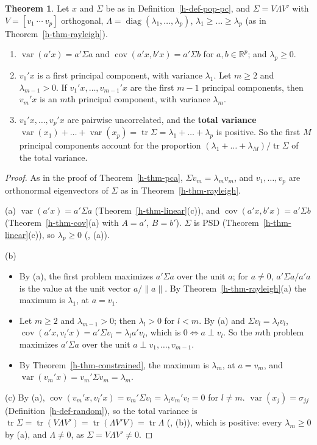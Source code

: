 \documentclass[12pt]{article}
\newcommand{\R}{\mathbb R}
\DeclareMathOperator{\tr}{tr}
\DeclareMathOperator{\diag}{diag}
\DeclareMathOperator\var{var}
\DeclareMathOperator\cov{cov}
\theoremstyle{definition}
\newtheorem{theorem}{Theorem}
\begin{document}
\begin{theorem}\label{h-thm-pop-pca}
Let \(x\) and \(\Sigma\) be as in Definition~\ref{h-def-pop-pc}, and \(\Sigma=V\Lambda V'\) with
\(V=[v_1\ \cdots\ v_p]\) orthogonal, \(\Lambda=\diag(\lambda_1,\dots,\lambda_p)\),
\(\lambda_1\geqslant\dots\geqslant\lambda_p\) (as in Theorem~\ref{h-thm-rayleigh}).
\begin{enumerate}
\item \(\var(a'x)=a'\Sigma a\) and \(\cov(a'x,b'x)=a'\Sigma b\) for \(a,b\in\R^p\); and
\(\lambda_p\geqslant0\).
\item \(v_1'x\) is a first principal component, with variance \(\lambda_1\). Let \(m\geqslant2\) and \(\lambda_{m-1}>0\).
If \(v_1'x,\dots,v_{m-1}'x\) are the first \(m-1\) principal components, then \(v_m'x\) is an \(m\)th principal
component, with variance \(\lambda_m\).
\item \(v_1'x,\dots,v_p'x\) are pairwise uncorrelated, and the \textbf{total variance}
\(\var(x_1)+\dots+\var(x_p)=\tr\Sigma=\lambda_1+\dots+\lambda_p\) is positive. So the first
\(M\) principal components account for the proportion \((\lambda_1+\dots+\lambda_M)/\tr\Sigma\) of the total variance.
\end{enumerate}
\end{theorem}
\begin{proof}
As in the proof of Theorem~\ref{h-thm-pca}, \(\Sigma v_m=\lambda_mv_m\), and \(v_1,\dots,v_p\) are orthonormal
eigenvectors of \(\Sigma\) as in Theorem~\ref{h-thm-rayleigh}.

(a) \(\var(a'x)=a'\Sigma a\) (Theorem~\ref{h-thm-linear}(c)), and \(\cov(a'x,b'x)=a'\Sigma b\)
(Theorem~\ref{h-thm-cov}(a) with \(A=a'\), \(B=b'\)).
\(\Sigma\) is PSD (Theorem~\ref{h-thm-linear}(c)), so \(\lambda_p\geqslant0\) (, (a)).

(b)
\begin{itemize}
\item By (a), the first problem maximizes \(a'\Sigma a\) over the unit \(a\); for \(a\ne0\), \(a'\Sigma a/a'a\) is the
value at the unit vector \(a/\lVert a\rVert\). By Theorem~\ref{h-thm-rayleigh}(a) the maximum is \(\lambda_1\), at
\(a=v_1\).
\item Let \(m\geqslant2\) and \(\lambda_{m-1}>0\); then \(\lambda_l>0\) for \(l<m\). By (a) and
\(\Sigma v_l=\lambda_lv_l\), \(\cov(a'x,v_l'x)=a'\Sigma v_l=\lambda_la'v_l\), which is \(0\iff a\perp v_l\).
So the \(m\)th problem maximizes \(a'\Sigma a\) over the unit \(a\perp v_1,\dots,v_{m-1}\).
\item By Theorem~\ref{h-thm-constrained}, the maximum is \(\lambda_m\), at \(a=v_m\), and
\(\var(v_m'x)=v_m'\Sigma v_m=\lambda_m\).
\end{itemize}
(c) By (a), \(\cov(v_m'x,v_l'x)=v_m'\Sigma v_l=\lambda_lv_m'v_l=0\) for \(l\ne m\).
\(\var(x_j)=\sigma_{jj}\) (Definition~\ref{h-def-random}), so the total variance is
\(\tr\Sigma=\tr(V\Lambda V')=\tr(\Lambda V'V)=\tr\Lambda\) (, (b)), which is positive: every \(\lambda_m\geqslant0\)
by (a), and \(\Lambda\ne0\), as \(\Sigma=V\Lambda V'\ne0\).
\end{proof}
\end{document}
